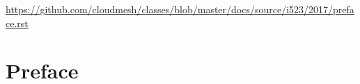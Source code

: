 \begin{fileremark}\url{https://github.com/cloudmesh/classes/blob/master/docs/source/i523/2017/preface.rst}\end{fileremark}
\section{Preface}\label{preface}
